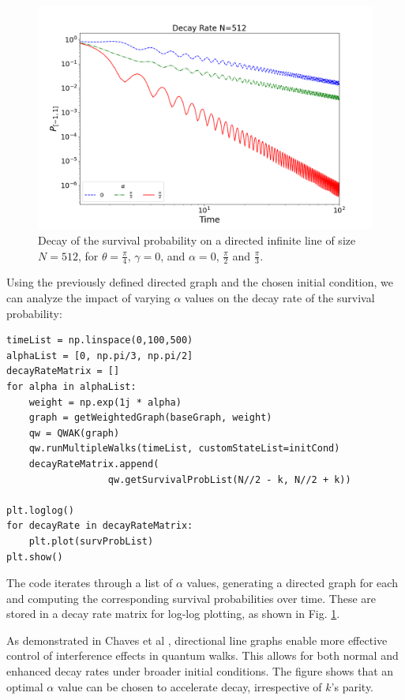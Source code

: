 \documentclass[main.tex]{subfiles}
\begin{document}
\begin{figure}[!h]
    \centering
    \includegraphics[scale=\mysinglefigurescale]{decMatrix512NW3_Alpha1.05-1.57S500TMAX100.png}
    \caption{Decay of the survival probability on a directed infinite line of
        size $N=512$, for $\theta =\frac{\pi}{4}$, $\gamma=0$, and $\alpha=0$,
        $\frac{\pi}{2}$ and $\frac{\pi}{3}$.}
    \label{fig:decay_rate_oriented_line}
\end{figure}

Using the previously defined directed graph and the chosen initial condition, we
can analyze the impact of varying $\alpha$ values on the decay rate of the
survival probability:

\begin{lstlisting}[style=code]
timeList = np.linspace(0,100,500)
alphaList = [0, np.pi/3, np.pi/2]
decayRateMatrix = []
for alpha in alphaList:
    weight = np.exp(1j * alpha)
    graph = getWeightedGraph(baseGraph, weight)
    qw = QWAK(graph)
    qw.runMultipleWalks(timeList, customStateList=initCond)
    decayRateMatrix.append(
                  qw.getSurvivalProbList(N//2 - k, N//2 + k))

plt.loglog()
for decayRate in decayRateMatrix:
    plt.plot(survProbList)
plt.show()
\end{lstlisting}

The code iterates through a list of $\alpha$ values, generating a directed
graph for each and computing the corresponding survival probabilities over
time. These are stored in a decay rate matrix for log-log plotting, as shown in
Fig. \ref{fig:decay_rate_oriented_line}.

As demonstrated in Chaves et al \cite{Chaves2023}, directional line graphs
enable more effective control of interference effects in quantum walks. This
allows for both normal and enhanced decay rates under broader initial
conditions. The figure shows that an optimal $\alpha$ value can be chosen to
accelerate decay, irrespective of $k$'s parity.
\end{document}
